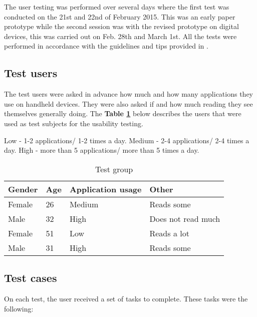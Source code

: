 The user testing was performed over several days where the first test was conducted on the 21st and 22nd of February 2015. This was an early paper prototype while the second session was with the revised prototype on digital devices\cite{protoIO}, this was carried out on Feb. 28th and March 1st. All the tests were performed in accordance with the guidelines and tips provided in \cite{shneiderman2014}.

\subsection{Test users}

The test users were asked in advance how much and how many applications they use on handheld devices. They were also asked if and how much reading they see themselves generally doing. The \textbf{Table \ref{Tab:testgroup}} below describes the users that were used as test subjects for the usability testing.  \newline

Low - 1-2 applications/ 1-2 times a day.\newline
Medium - 2-4 applications/ 2-4 times a day.\newline
High - more than 5 applications/ more than 5 times a day.

\begin{table}[H]
	\caption{Test group}
	\label{Tab:testgroup}
	\begin{center}
		\begin{tabular}{ | l | l | l | l |}
			\hline
			\textbf{Gender} & \textbf{Age} & \textbf{Application usage} & \textbf{Other} \\ \hline
			Female & 26 & Medium & Reads some \\\hline
			Male & 32 & High & Does not read much \\\hline
			Female & 51 & Low & Reads a lot \\\hline
			Male & 31 & High & Reads some \\\hline 	
		\end{tabular}
	\end{center}
\end{table}

\subsection{Test cases}

On each test, the user received a set of tasks to complete. These tasks were the following:


